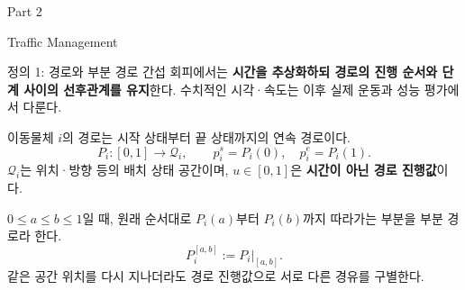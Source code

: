 \begin{frame}[plain]
\centering
{\color{accent}\LARGE Part 2\par}\vspace{8mm}
{\LARGE Traffic Management\par}
\end{frame}

\begin{frame}{정의 1: 경로와 부분 경로}
\small 간섭 회피에서는 \textbf{시간을 추상화하되 경로의 진행 순서와 단계 사이의 선후관계를 유지}한다. 수치적인 시각·속도는 이후 실제 운동과 성능 평가에서 다룬다.
\medskip\par
\normalsize 이동물체 $i$의 경로는 시작 상태부터 끝 상태까지의 연속 경로이다.
\begin{equation}
P_i:[0,1]\longrightarrow\mathcal Q_i,\qquad p_i^s=P_i(0),\quad p_i^e=P_i(1).
\tag{1}
\end{equation}
\small $\mathcal Q_i$는 위치·방향 등의 배치 상태 공간이며, $u\in[0,1]$은 \textbf{시간이 아닌 경로 진행값}이다.
\medskip\par
\normalsize $0\le a\le b\le1$일 때, 원래 순서대로 $P_i(a)$부터 $P_i(b)$까지 따라가는 부분을 부분 경로라 한다.
\begin{equation}
P_i^{[a,b]}:=P_i\big|_{[a,b]}.
\tag{2}
\end{equation}
\small 같은 공간 위치를 다시 지나더라도 경로 진행값으로 서로 다른 경유를 구별한다.
\end{frame}

